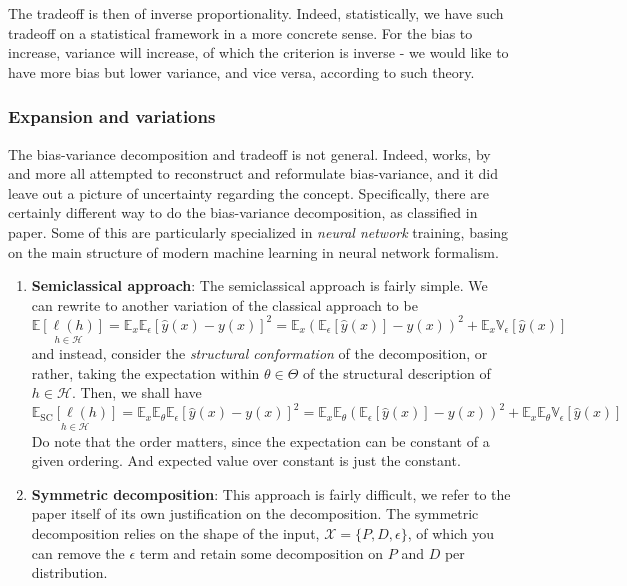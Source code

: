\documentclass[10pt]{article} %
\begin{document}
The tradeoff is then of inverse proportionality. Indeed, statistically, we have such tradeoff on a statistical framework in a more concrete sense. For the bias to increase, variance will increase, of which the criterion is inverse - we would like to have more bias but lower variance, and vice versa, according to such theory. 

\subsubsection{Expansion and variations}

The bias-variance decomposition and tradeoff is not general. Indeed, works, by \cite{6797087,sharma_bias-variance_2014,domingos_unifeid_2000,adlam2020understandingdoubledescentrequires,yang_rethinking_2020} and more all attempted to reconstruct and reformulate bias-variance, and it did leave out a picture of uncertainty regarding the concept. Specifically, there are certainly different way to do the bias-variance decomposition, as classified in \cite{adlam2020understandingdoubledescentrequires} paper. Some of this are particularly specialized in \textit{neural network} training, basing on the main structure of modern machine learning in neural network formalism. 
\begin{enumerate}[leftmargin=1cm,itemsep=2pt,topsep=1pt]
    \item \textbf{Semiclassical approach}: The semiclassical approach is fairly simple. We can rewrite to another variation of the classical approach to be \begin{equation}
        \underset{h\in\mathcal{H}}{\mathbb{E}[\ell(h)]} = \mathbb{E}_{x}\mathbb{E}_{\epsilon}\left[\hat{y}(x)-y(x)\right]^{2} = \mathbb{E}_{x}\left(\mathbb{E}_{\epsilon}[\hat{y}(x)]-y(x)\right)^{2} + \mathbb{E}_{x}\mathbb{V}_{\epsilon}\left[\hat{y}(x)\right]  
    \end{equation}
    and instead, consider the \textit{structural conformation} of the decomposition, or rather, taking the expectation within $\theta\in \Theta$ of the structural description of $h\in\mathcal{H}$. Then, we shall have 
    \begin{equation}
        \underset{h\in\mathcal{H}}{\mathbb{E}_{\mathrm{SC}}[\ell(h)]} = \mathbb{E}_{x}\mathbb{E}_{\theta}\mathbb{E}_{\epsilon}\left[\hat{y}(x)-y(x)\right]^{2} = \mathbb{E}_{x}\mathbb{E}_{\theta}\left(\mathbb{E}_{\epsilon}[\hat{y}(x)]-y(x)\right)^{2} + \mathbb{E}_{x}\mathbb{E}_{\theta}\mathbb{V}_{\epsilon}\left[\hat{y}(x)\right]
    \end{equation}
    Do note that the order matters, since the expectation can be constant of a given ordering. And expected value over constant is just the constant. 
    \item \textbf{Symmetric decomposition}: This approach is fairly difficult, we refer to the paper itself of its own justification on the decomposition. The symmetric decomposition relies on the shape of the input, $\mathcal{X}=\{P,D,\epsilon\}$, of which you can remove the $\epsilon$ term and retain some decomposition on $P$ and $D$ per distribution. 
\end{enumerate}
\end{document}
